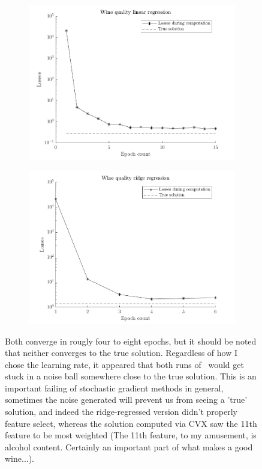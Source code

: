 \begin{figure}[!htb]
  \centering
  \begin{subfigure}{.5\textwidth}
    \centering
    \includegraphics[width=\linewidth]{./resources/linear_wine}
    \caption{}\label{fig:linearwine}
  \end{subfigure}%
  \begin{subfigure}{.5\textwidth}
    \centering
    \includegraphics[width=\linewidth]{./resources/ridge_wine}
    \caption{}\label{fig:ridgewine}
  \end{subfigure}
  \caption{
    Both converge in rougly four to eight epochs, but it should be noted
    that neither converges to the true solution. Regardless of how I chose the
    learning rate, it appeared that both runs of \hogwild\ would get stuck in
    a noise ball somewhere close to the true solution. This is an important
    failing of stochastic gradient methods in general, sometimes the noise
    generated will prevent us from seeing a 'true' solution, and indeed the
    ridge-regressed version didn't properly feature select, whereas the solution
    computed via CVX saw the 11th feature to be most weighted (The 11th feature,
    to my amusement, is alcohol content. Certainly an important part of what
    makes a good wine...).
  }
\end{figure}
